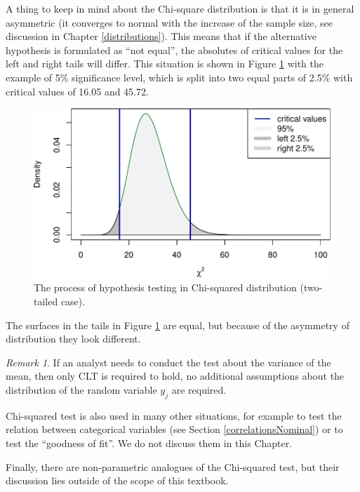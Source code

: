 \documentclass[
]{book}
\theoremstyle{definition}
\theoremstyle{definition}
\theoremstyle{definition}
\theoremstyle{definition}
\theoremstyle{remark}
\newtheorem*{remark}{Remark}
\begin{document}
A thing to keep in mind about the Chi-square distribution is that it is in general asymmetric (it converges to normal with the increase of the sample size, see discussion in Chapter \ref{distributions}). This means that if the alternative hypothesis is formulated as ``not equal'', the absolutes of critical values for the left and right tails will differ. This situation is shown in Figure \ref{fig:hypothesisTestingChiSquared2} with the example of 5\% significance level, which is split into two equal parts of 2.5\% with critical values of 16.05 and 45.72.

\begin{figure}
\centering
\includegraphics{Svetunkov---Statistics-for-Business-Analytics_files/figure-latex/hypothesisTestingChiSquared2-1.pdf}
\caption{\label{fig:hypothesisTestingChiSquared2}The process of hypothesis testing in Chi-squared distribution (two-tailed case).}
\end{figure}

The surfaces in the tails in Figure \ref{fig:hypothesisTestingChiSquared2} are equal, but because of the asymmetry of distribution they look different.

\begin{remark}
If an analyst needs to conduct the test about the variance of the mean, then only CLT is required to hold, no additional assumptions about the distribution of the random variable \(y_j\) are required.
\end{remark}

Chi-squared test is also used in many other situations, for example to test the relation between categorical variables (see Section \ref{correlationsNominal}) or to test the ``goodness of fit''. We do not discuss them in this Chapter.

Finally, there are non-parametric analogues of the Chi-squared test, but their discussion lies outside of the scope of this textbook.
\end{document}
